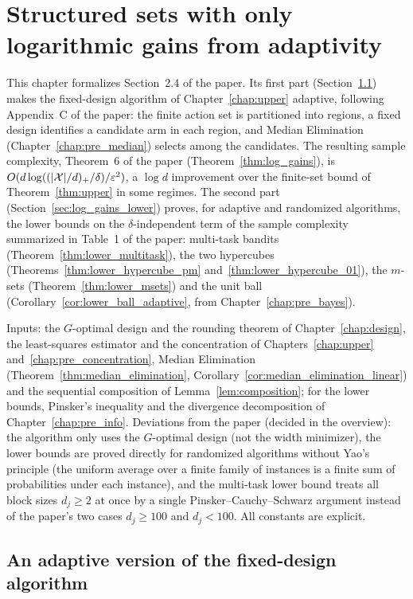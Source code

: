 \chapter{Structured sets with only logarithmic gains from adaptivity}
\label{chap:log_gains}

This chapter formalizes Section~2.4 of the paper. Its first part
(Section~\ref{sec:log_gains_algorithm}) makes the fixed-design algorithm of
Chapter~\ref{chap:upper} adaptive, following Appendix~C of the paper: the finite action set is
partitioned into regions, a fixed design identifies a candidate arm in each region, and
Median Elimination (Chapter~\ref{chap:pre_median}) selects among the candidates. The
resulting sample complexity, Theorem~6 of the paper (Theorem~\ref{thm:log_gains}), is
$O(d\log((\lvert \mathcal{X} \rvert/d)_+/\delta)/\varepsilon^2)$, a $\log d$ improvement over the finite-set bound of
Theorem~\ref{thm:upper} in some regimes. The second part
(Section~\ref{sec:log_gains_lower}) proves, for adaptive and randomized algorithms, the
lower bounds on the $\delta$-independent term of the sample complexity summarized in
Table~1 of the paper: multi-task bandits (Theorem~\ref{thm:lower_multitask}), the two
hypercubes (Theorems~\ref{thm:lower_hypercube_pm} and~\ref{thm:lower_hypercube_01}), the
$m$-sets (Theorem~\ref{thm:lower_msets}) and the unit ball
(Corollary~\ref{cor:lower_ball_adaptive}, from Chapter~\ref{chap:pre_bayes}).

Inputs: the $G$-optimal design and the rounding theorem of Chapter~\ref{chap:design}, the
least-squares estimator and the concentration of Chapters~\ref{chap:upper}
and~\ref{chap:pre_concentration}, Median Elimination (Theorem~\ref{thm:median_elimination},
Corollary~\ref{cor:median_elimination_linear}) and the sequential composition of
Lemma~\ref{lem:composition}; for the lower bounds, Pinsker's inequality and the divergence
decomposition of Chapter~\ref{chap:pre_info}. Deviations from the paper (decided in the
overview): the algorithm only uses the $G$-optimal design (not the width minimizer), the
lower bounds are proved directly for randomized algorithms without Yao's principle (the
uniform average over a finite family of instances is a finite sum of probabilities under
each instance), and the multi-task lower bound treats all block sizes $d_j \ge 2$ at once by
a single Pinsker--Cauchy--Schwarz argument instead of the paper's two cases $d_j \ge 100$ and
$d_j < 100$. All constants are explicit.

\section{An adaptive version of the fixed-design algorithm}
\label{sec:log_gains_algorithm}

